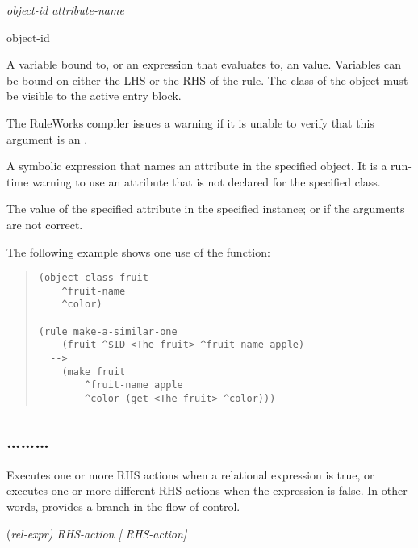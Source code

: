 \Format

 \it{object-id} \ct\it{attribute-name}

\begin{arguments}
\item[object-id]

  A variable bound to, or an expression that evaluates to, an
   value. Variables can be bound on either the LHS or
  the RHS of the rule. The class of the object must be visible to the
  active entry block.

  The RuleWorks compiler issues a warning if it is unable to verify
  that this argument is an .

\item[\ct{attribute-name}]

  A symbolic expression that names an attribute in the specified
  object. It is a run-time warning to use an attribute that is not
  declared for the specified class.
\end{arguments}

\ReturnValue

The value of the specified attribute in the specified instance; or
 if the arguments are not correct.

\Example

The following example shows one use of the  function:

\begin{quote}
\begin{verbatim}
(object-class fruit
    ^fruit-name
    ^color)

(rule make-a-similar-one
    (fruit ^$ID <The-fruit> ^fruit-name apple)
  -->
    (make fruit
        ^fruit-name apple 
        ^color (get <The-fruit> ^color)))
\end{verbatim}
\end{quote}

\subsection{\ldots{}\ldots{}\ldots}

Executes one or more RHS actions when a relational expression is true,
or executes one or more different RHS actions when the expression is
false. In other words, provides a branch in the flow of control.

\Format

 \co(\it{rel-expr}\co)
      \it{RHS-action}
     [ \it{RHS-action}]

